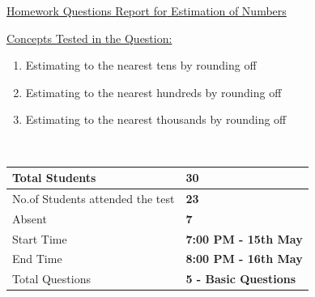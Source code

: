 \documentclass[12pt]{article}%
\begin{document}

\begin{center}
   \large \underline{{Homework Questions Report for} {Estimation of Numbers}}
\end{center}
\begin{center}
\underline{Concepts Tested in the Question:}
\end{center}
\begin{enumerate}
    \item Estimating to the nearest tens by rounding off
    \item Estimating to the nearest hundreds by rounding off
    \item Estimating to the nearest thousands by rounding off
\end{enumerate}

\vspace{1cm}\\

\begin{tabularx}{0.9\textwidth} { 
  | >{\centering\arraybackslash}X 
  | >{\centering\arraybackslash}X | }
 \hline
 Total Students & \textbf{30}\\
 \hline
 No.of Students attended the test  & \textbf{23}\\
\hline
 Absent & \textbf{7} \\
\hline
 Start Time & \textbf{7:00 PM - 15th May} \\
\hline
 End Time & \textbf{8:00 PM - 16th May} \\
\hline
 Total Questions & \textbf{5 - Basic Questions} \\
\hline
\end{tabularx}
\vspace{1.5cm}\\
\end{document}
